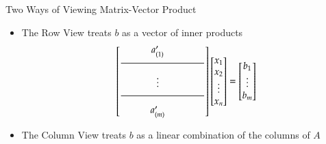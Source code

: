 \documentclass[10pt]{beamer}
\begin{document}
\begin{frame}{Two Ways of Viewing Matrix-Vector Product}

\begin{itemize}
\item The Row View treats $b$ as a vector of inner products
\begin{equation*}
\begin{bmatrix}\begin{matrix} & & a'_{(1)}& & & \end{matrix} \\
       \dfrac{\makebox[1.2in]{}}{\makebox[1.2in]{}} \\
       \begin{matrix} & & \vdots & & & \end{matrix} \\
       \dfrac{\makebox[1.2in]{}}{\makebox[1.2in]{}} \\
       \begin{matrix} & & a'_{(m)}& & & \end{matrix}
\end{bmatrix}
\begin{bmatrix} x_1 \\ x_2 \\ \vdots \\ x_n \end{bmatrix} = 
\begin{bmatrix} b_1 \\ \vdots \\ b_m \end{bmatrix}
\end{equation*}

\item The Column View treats $b$ as a linear combination of the columns of $A$


\end{itemize}
\end{frame}
\end{document}
